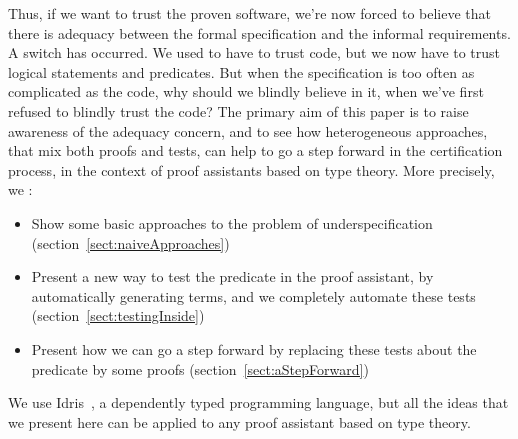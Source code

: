 Thus, if we want to trust the proven software, we're now forced to believe that there is adequacy between the formal specification and the informal requirements. A switch has occurred. We used to have to trust code, but we now have to trust logical statements and predicates. But when the specification is too often as complicated as the code, why should we blindly believe in it, when we've first refused to blindly trust the code? The primary aim of this paper is to raise awareness of the adequacy concern, and to see how heterogeneous approaches, that mix both proofs and tests, can help to go a step forward in the certification process, in the context of proof assistants based on type theory.
More precisely, we :
\begin{itemize}
	\item Show some basic approaches to the problem of underspecification (section~\ref{sect:naiveApproaches})
	\item Present a new way to test the predicate in the proof assistant, by automatically generating terms, and we completely automate these tests (section~\ref{sect:testingInside})
	\item Present how we can go a step forward by replacing these tests about the predicate by some proofs (section~\ref{sect:aStepForward})
\end{itemize}

We use Idris~\cite{brady2013idris}, a dependently typed programming language, but all the ideas that we present here can be applied to any proof assistant based on type theory.

